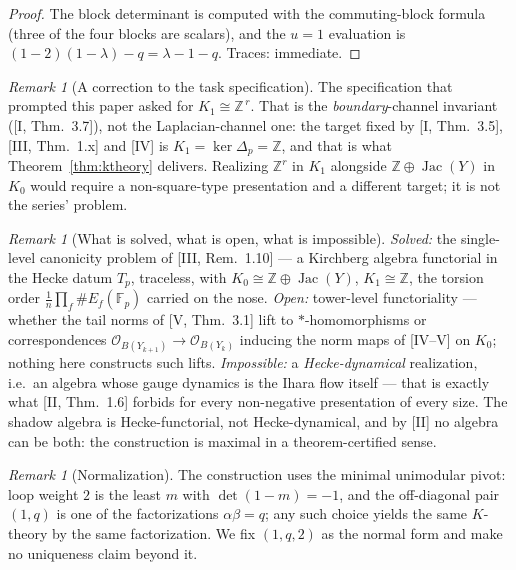 \documentclass[11pt]{amsart}
\numberwithin{equation}{section}
\theoremstyle{definition}
\theoremstyle{remark}
\newtheorem{remark}[theorem]{Remark}
\newcommand{\Z}{\mathbb{Z}}
\newcommand{\F}{\mathbb{F}}
\newcommand{\cO}{\mathcal{O}}
\newcommand{\Jac}{\operatorname{Jac}}
\begin{document}
\begin{proof}
The block determinant is computed with the commuting-block formula (three of the
four blocks are scalars), and the $u=1$ evaluation is
$(1-2)(1-\lambda)-q=\lambda-1-q$. Traces: immediate.
\end{proof}

\begin{remark}[A correction to the task specification]\label{rem:k1}
The specification that prompted this paper asked for $K_1\cong\Z^{\,r}$. That is the
\emph{boundary}-channel invariant ([I, Thm.~3.7]), not the Laplacian-channel one:
the target fixed by [I, Thm.~3.5], [III, Thm.~1.x] and [IV] is
$K_1=\ker\Delta_p=\Z$, and that is what Theorem~\ref{thm:ktheory} delivers.
Realizing $\Z^r$ in $K_1$ alongside $\Z\oplus\Jac(Y)$ in $K_0$ would require a
non-square-type presentation and a different target; it is not the series' problem.
\end{remark}

\begin{remark}[What is solved, what is open, what is impossible]\label{rem:scope}
\emph{Solved:} the single-level canonicity problem of [III, Rem.~1.10] --- a
Kirchberg algebra functorial in the Hecke datum $T_p$, traceless, with
$K_0\cong\Z\oplus\Jac(Y)$, $K_1\cong\Z$, the torsion order
$\frac1n\prod_f\#E_f(\F_p)$ carried on the nose. \emph{Open:} tower-level
functoriality --- whether the tail norms of [V, Thm.~3.1] lift to
$*$-homomorphisms or correspondences
$\cO_{B(Y_{k+1})}\to\cO_{B(Y_k)}$ inducing the norm maps of [IV--V] on $K_0$; nothing
here constructs such lifts. \emph{Impossible:} a \emph{Hecke-dynamical} realization,
i.e.\ an algebra whose gauge dynamics is the Ihara flow itself --- that is exactly
what [II, Thm.~1.6] forbids for every non-negative presentation of every size. The
shadow algebra is Hecke-functorial, not Hecke-dynamical, and by [II] no algebra can
be both: the construction is maximal in a theorem-certified sense.
\end{remark}

\begin{remark}[Normalization]\label{rem:norm}
The construction uses the minimal unimodular pivot: loop weight $2$ is the least $m$
with $\det(1-m)=-1$, and the off-diagonal pair $(1,q)$ is one of the factorizations
$\alpha\beta=q$; any such choice yields the same $K$-theory by the same
factorization. We fix $(1,q,2)$ as the normal form and make no uniqueness claim
beyond it.
\end{remark}
\end{document}
